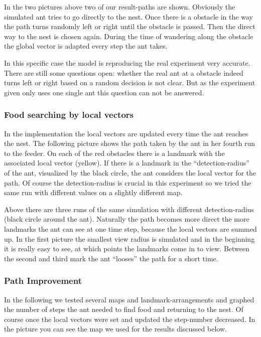 \documentclass[11pt]{article}
\begin{document}
In the two pictures above two of our result-paths are shown. Obviously the simulated ant tries to go directly to the nest. Once there is a obstacle in the way the path turns randomly left or right until the obstacle is passed. Then the direct way to the nest is chosen again. During the time of wandering along the obstacle the global vector is adapted every step the ant takes.

In this specific case the model is reproducing the real experiment very accurate. There are still some questions open: whether the real ant at a obstacle indeed turns left or right based on a random decision is not clear. But as the experiment given only uses one single ant this question can not be answered.

\subsubsection{Food searching by local vectors}
In the implementation the local vectors are updated every time the ant reaches the nest. The following picture shows the path taken by the ant in her fourth run to the feeder. On each of the red obstacles there is a landmark with the associated local vector (yellow). If there is a landmark in the “detection-radius” of the ant, visualized by the black circle, the ant considers the local vector for the path. Of course the detection-radius is crucial in this experiment so we tried the same run with different values on a slightly different map.

Above there are three runs of the same simulation with different detection-radius (black circle around the ant). Naturally the path becomes more direct the more landmarks the ant can see at one time step, because the local vectors are summed up. In the first picture the smallest view radius is simulated and in the beginning it is really easy to see, at which points the landmarks come in to view. Between the second and third mark the ant “looses” the path for a short time.

\subsubsection{Path Improvement}
In the following we tested several maps and landmark-arrangements and graphed the number of steps the ant needed to find food and returning to the nest. Of course once the local vectors were set and updated the step-number decreased. In the picture you can see the map we used for the results discussed below.
\end{document}
